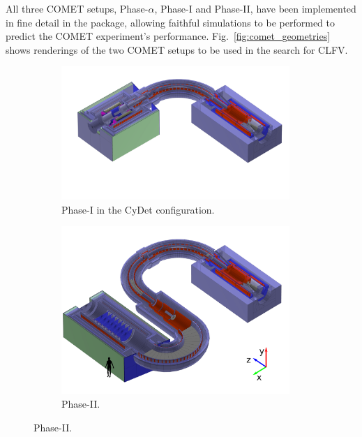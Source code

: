 

All three COMET setups, Phase-$\alpha$, Phase-I and Phase-II, have been implemented in fine detail in the \SimG package, allowing faithful simulations to be performed to predict the COMET experiment's performance. %
Fig.~\ref{fig:comet_geometries} shows renderings of the two COMET setups to be used in the search for CLFV.

\begin{figure}
    \centering
    \captionsetup[subfigure]{justification=centering}
    \begin{subfigure}[t]{0.49\textwidth}
        \centering
        \includegraphics[width=0.95\textwidth]{chapter3/geometries_Phase-I_iso_cropless_huesat.png}
        \caption{Phase-I in the CyDet configuration.}
    \end{subfigure}
    \hfill
    \begin{subfigure}[t]{0.49\textwidth}
        \centering
        \includegraphics[width=0.95\textwidth]{chapter3/geometries_Phase-II_iso_huesat_human.png}
        \caption{Phase-II.}
    \end{subfigure}
    

\end{figure}
